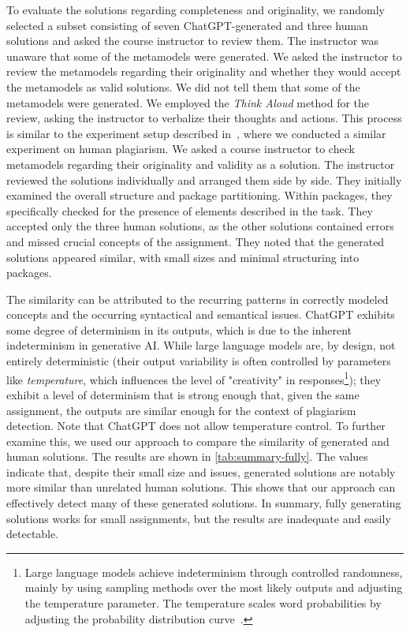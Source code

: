 To evaluate the solutions regarding completeness and originality, we randomly selected a subset consisting of seven ChatGPT-generated and three human solutions and asked the course instructor to review them. The instructor was unaware that some of the metamodels were generated.
%
We asked the instructor to review the metamodels regarding their originality and whether they would accept the metamodels as valid solutions. We did not tell them that some of the metamodels were generated.
We employed the \textit{Think Aloud} method for the review, asking the instructor to verbalize their thoughts and actions.
%
This process is similar to the experiment setup described in~\cite{Saglam2023}, where we conducted a similar experiment on human plagiarism. We asked a course instructor to check metamodels regarding their originality and validity as a solution.
%
The instructor reviewed the solutions individually and arranged them side by side. They initially examined the overall structure and package partitioning. Within packages, they specifically checked for the presence of elements described in the task.
%
They accepted only the three human solutions, as the other solutions contained errors and missed crucial concepts of the assignment.
%
They noted that the generated solutions appeared similar, with small sizes and minimal structuring into packages.

The similarity can be attributed to the recurring patterns in correctly modeled concepts and the occurring syntactical and semantical issues.
ChatGPT exhibits some degree of determinism in its outputs, which is due to the inherent indeterminism in generative AI. While large language models are, by design, not entirely deterministic (their output variability is often controlled by parameters like \textit{temperature}, which influences the level of "creativity" in responses\footnote{Large language models achieve indeterminism through controlled randomness, mainly by using sampling methods over the most likely outputs and adjusting the temperature parameter. The temperature scales word probabilities by adjusting the probability distribution curve~\cite{Ouyang2023}.}); they exhibit a level of determinism that is strong enough that, given the same assignment, the outputs are similar enough for the context of plagiarism detection. Note that ChatGPT does not allow temperature control.
To further examine this, we used our approach to compare the similarity of generated and human solutions.
The results are shown in \autoref{tab:summary-fully}.
The values indicate that, despite their small size and issues, generated solutions are notably more similar than unrelated human solutions.
This shows that our approach can effectively detect many of these generated solutions.
In summary, fully generating solutions works for small assignments, but the results are inadequate and easily detectable.

